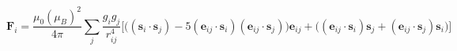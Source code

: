 \documentclass[preview]{standalone}
\begin{document}
\begin{varwidth}{50in}
  \begin{equation}
    \bm{F}_i =
    \frac{\mu_0 (\mu_B)^2}{4\pi} \sum_j
    \frac{g_i g_j}{r_{ij}^4}
    \Big[\big( (\bm{s}_i\cdot\bm{s}_j) 
    -5(\bm{e}_{ij}\cdot\bm{s}_i)
    (\bm{e}_{ij}\cdot\bm{s}_j)\big) \bm{e}_{ij}+
    \big(
    (\bm{e}_{ij}\cdot\bm{s}_i)\bm{s}_j+
    (\bm{e}_{ij}\cdot\bm{s}_j)\bm{s}_i
    \big)
    \Big]
    \nonumber
  \end{equation}
\end{varwidth}
\end{document}
